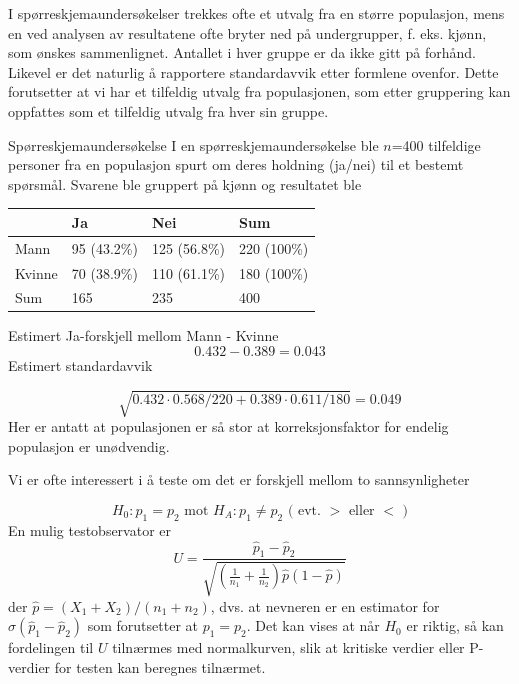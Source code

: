 I spørreskjemaundersøkelser trekkes ofte et utvalg fra en
større populasjon, mens en ved analysen av resultatene ofte bryter
ned på undergrupper, f. eks. kjønn, som ønskes
sammenlignet.  Antallet i hver gruppe er da ikke gitt på forhånd.
Likevel er det naturlig å rapportere standardavvik etter formlene
ovenfor.  Dette forutsetter at vi har et tilfeldig utvalg fra
populasjonen, som etter gruppering kan oppfattes som et tilfeldig
utvalg fra hver sin gruppe. \\

\begin{eksempel}{Spørreskjemaundersøkelse}
I en spørreskjemaundersøkelse ble $n$=400 tilfeldige personer
fra en populasjon spurt om deres holdning (ja/nei) til et bestemt
spørsmål.  Svarene ble gruppert på kjønn og resultatet ble
\begin{center}
\begin{tabular}{l|ll|l} 
         &         Ja       &     Nei        &      Sum     \\ \hline
Mann     &     95 (43.2\%)  &  125 (56.8\%)  &   220 (100\%) \\	
Kvinne   &     70 (38.9\%)  &  110 (61.1\%)  &   180 (100\%) \\ \hline
Sum      &    165           &  235           &   400         \\ \hline
\end{tabular}
\end{center}
Estimert Ja-forskjell mellom Mann - Kvinne 
\[         0.432 - 0.389 = 0.043   \]
Estimert standardavvik

\[\sqrt{0.432\cdot 0.568/220 + 0.389\cdot 0.611/180} = 0.049  \]
Her er antatt at populasjonen er så stor at korreksjonsfaktor for 
endelig populasjon er unødvendig. \\
\end{eksempel}
Vi er ofte interessert i å teste om det er forskjell mellom to
sannsynligheter

\[ H_0: p_1 = p_2 \mbox{\ \ \ mot \ \ \ } H_A: p_1 \neq p_2 
                       \mbox{\ \ ( evt. $>$ eller $<$ )}  \]
En mulig testobservator er 
\[   U=\frac{\hat{p}_1-\hat{p}_2}
           {\sqrt{(\frac{1}{n_1}+\frac{1}{n_2})\hat{p} (1-\hat{p} )}} \]
der ${\hat{p}} = (X_1 + X_2)/(n_1 + n_2)$, dvs. at nevneren er en estimator
for $\sigma({\hat{p}}_1 - {\hat{p}}_2)$ som forutsetter at $p_1=p_2$.
Det kan vises at når $H_0$ er riktig, så kan fordelingen til $U$
tilnærmes med normalkurven, slik at kritiske verdier eller P-verdier for
testen kan beregnes tilnærmet.

